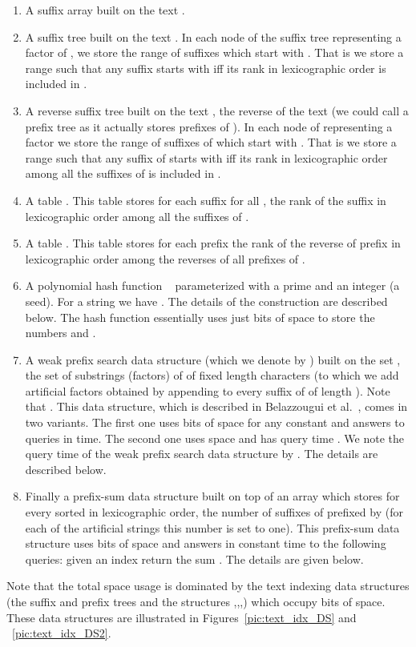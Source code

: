 \documentclass{article}
\newcommand{\?}{\mskip1.5mu}
\begin{document}
\begin{enumerate}
\item A suffix array  built on the text . 
\item A suffix tree  built on the text . In each node of the suffix tree representing a factor  of , we store the range of suffixes which start with . That is we store a range  such that any suffix starts with  iff its rank  in lexicographic order is included in . 
\item A reverse suffix tree  built on the text , the reverse of the text  (we could call  a prefix tree as it actually stores prefixes of ). In each node of  representing a factor  we store the range of suffixes of  which start with . That is we store a range  such that any suffix of  starts with  iff its rank  in lexicographic order among all the suffixes of  is included in . 
\item A table . This table stores for each suffix  for all , the rank of the suffix  in lexicographic order among all the suffixes of . 
\item A table . This table stores for each prefix  the rank of the reverse of prefix  in lexicographic order among the reverses of all prefixes of .  
\item A polynomial hash function ~\cite{KR87} parameterized with a prime  and an integer  (a seed). For a string  we have . The details of the construction are described below. The hash function essentially uses just  bits of space to store the numbers  and . 
\item A weak prefix search data structure (which we denote by ) built on the set , the set of substrings (factors) of  of fixed length  characters (to which we add  artificial factors obtained by appending  to every suffix of  of length  ). Note that . This data structure, which is described in Belazzougui et al.~\cite{BBPV10}, comes in two variants. The first one uses  bits of space for any constant  and answers to queries in  time.  The second one uses space  and has query time . We note the query time of the weak prefix search data structure by . The details are described below. 
\item Finally a prefix-sum data structure  built on top of an array  which stores for every  sorted in lexicographic order, the number of suffixes of  prefixed by  (for each of the artificial strings this number is set to one). This prefix-sum data structure uses  bits of space and answers in constant time to the following queries: given an index  return the sum . The details are given below. 
\end{enumerate}
Note that the total space usage is dominated by the text indexing data structures (the suffix and prefix trees and the structures ,,,) which occupy  bits of space. These data structures are illustrated in Figures~\ref{pic:text_idx_DS} and ~\ref{pic:text_idx_DS2}. 
\end{document}
